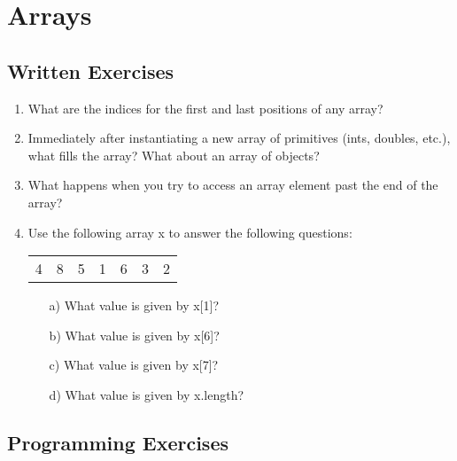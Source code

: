 \section{Arrays}

\subsection{Written Exercises}

\setcounter{counter}{1}
\begin{enumerate}[label={\arabic{counter}\addtocounter{counter}{1}}.]

\item What are the indices for the first and last positions of any array?

\item Immediately after instantiating a new array of primitives (ints, doubles, etc.), what fills the array? What about an array of objects?

\item What happens when you try to access an array element past the end of the array?

\item Use the following array x to answer the following questions:
\begin{table}[h]
\begin{tabular}{lllllll}
4 & 8 & 5 & 1 & 6 & 3 & 2
\end{tabular}
\end{table}
\begin{enumerate}
\item[a)]What value is given by x[1]?
\item[b)]What value is given by x[6]?
\item[c)]What value is given by x[7]?
\item[d)]What value is given by x.length?
\end{enumerate}

\end{enumerate}

\subsection{Programming Exercises}

